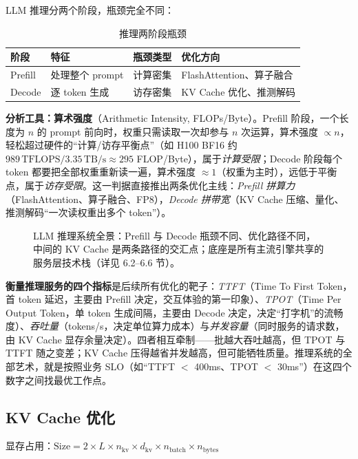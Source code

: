 \documentclass[12pt,a4paper]{article}
\begin{document}
LLM 推理分两个阶段，瓶颈完全不同：

\begin{table}[htbp]
\centering
\small
\begin{tabular}{@{}llll@{}}
\toprule
\textbf{阶段} & \textbf{特征} & \textbf{瓶颈类型} & \textbf{优化方向}\\
\midrule
Prefill & 处理整个 prompt & 计算密集 & FlashAttention、算子融合\\
Decode & 逐 token 生成 & 访存密集 & KV Cache 优化、推测解码\\
\bottomrule
\end{tabular}
\caption{推理两阶段瓶颈}
\end{table}

\textbf{分析工具：算术强度}（Arithmetic Intensity, FLOPs/Byte）。Prefill 阶段，一个长度为 $n$ 的 prompt 前向时，权重只需读取一次却参与 $n$ 次运算，算术强度 $\propto n$，轻松超过硬件的“计算/访存平衡点”（如 H100 BF16 约 $989\,\text{TFLOPS} / 3.35\,\text{TB/s} \approx 295$ FLOP/Byte），属于\emph{计算受限}；Decode 阶段每个 token 都要把全部权重重新读一遍，算术强度 $\approx 1$（权重为主时），远低于平衡点，属于\emph{访存受限}。这一判据直接推出两条优化主线：\emph{Prefill 拼算力}（FlashAttention、算子融合、FP8），\emph{Decode 拼带宽}（KV Cache 压缩、量化、推测解码“一次读权重出多个 token”）。

\begin{figure}[htbp]
\centering

\caption{LLM 推理系统全景：Prefill 与 Decode 瓶颈不同、优化路径不同，中间的 KV Cache 是两条路径的交汇点；底座是所有主流引擎共享的服务层技术栈（详见 6.2--6.6 节）。}
\label{fig:infer}
\end{figure}

\textbf{衡量推理服务的四个指标}是后续所有优化的靶子：\emph{TTFT}（Time To First Token，首 token 延迟，主要由 Prefill 决定，交互体验的第一印象）、\emph{TPOT}（Time Per Output Token，单 token 生成间隔，主要由 Decode 决定，决定“打字机”的流畅度）、\emph{吞吐量}（tokens/s，决定单位算力成本）与\emph{并发容量}（同时服务的请求数，由 KV Cache 显存余量决定）。四者相互牵制——批越大吞吐越高，但 TPOT 与 TTFT 随之变差；KV Cache 压得越省并发越高，但可能牺牲质量。推理系统的全部艺术，就是按照业务 SLO（如“TTFT $<$ 400ms、TPOT $<$ 30ms”）在这四个数字之间找最优工作点。

\subsection{KV Cache 优化}

显存占用：$\text{Size} = 2 \times L \times n_{\text{kv}} \times d_{\text{kv}} \times n_{\text{batch}} \times n_{\text{bytes}}$
\end{document}
